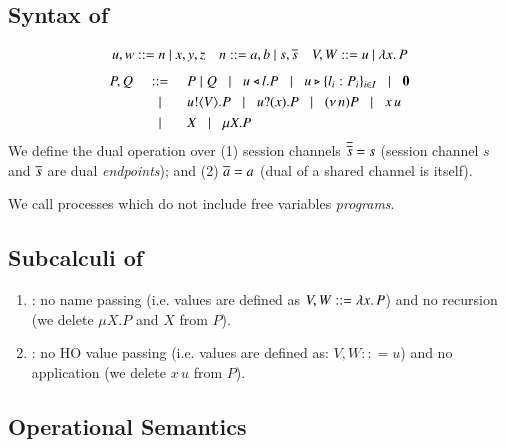 \subsection{Syntax of \HOp}
\label{subsec:syntax}
\[ 
\begin{array}{lll}
u,w  ::=  n \ | \ x,y,z
& n ::= a,b  \ | \ s, \overline{s} 
& V,W  ::=   u \ | \ \lambda x.\,P
\end{array}
\]
\[
\begin{array}{rclllll}
P,Q & ::= &  P\;|\; Q \;\;\;|\;\;\; 
 u \triangleleft l . P \;\;\;|\;\;\; u \triangleright \{l_i:P_i\}_{i \in I} \;\;\;|\;\;\; \mathbf{0} \\[1mm]
  & \;\;\;|\;\;\; & u ! \langle V \rangle .{P} \;\;\;|\;\;\; u ? (x) .{P} \;\;\;|\;\;\; (\nu\, n) P 
\;\;\;|\;\;\; x\, {u} 
\\[1mm]
      & \;\;\;|\;\;\; & X \;\;\;|\;\;\; \mu X. P
\end{array}
\]
We define the dual operation over (1) session channels $\overline{\overline{s}} = s$
(session channel $s$ and $\overline{s}$ are dual \emph{endpoints}); and 
(2) $\overline{a} = a$ (dual of a shared channel is itself).  

We call processes which do not include free variables {\em programs}.

\subsection{Subcalculi of \HOp}
\label{subsec:subcalculi}
\begin{enumerate}[$\bullet$]
\item \HO: no name passing 
(i.e. values are defined as $V,W :: = \lambda x.\,P$)
and no recursion (we delete $\mu X.P$ and $X$ from $P$).   
\item \sessp: no HO value passing (i.e. 
values are defined as:
$V,W :: = u$) and no application (we delete $x\, u$ from $P$). 
\end{enumerate}

\subsection{Operational Semantics}
\label{subsec:semantics}



